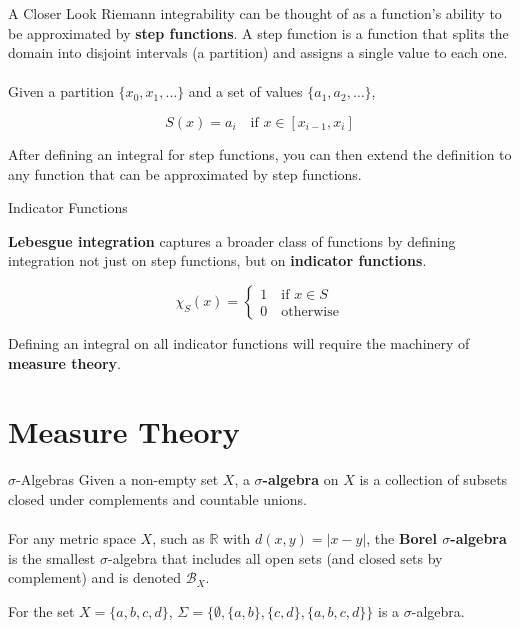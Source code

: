 \documentclass{beamer}
\begin{document}
\begin{frame}{A Closer Look}
    Riemann integrability can be thought of as a function's ability
    to be approximated by \textbf{step functions}. A step function
    is a function that splits the domain into disjoint intervals
    (a partition) and 
    assigns a single value to each one.\\~\\
    Given a partition $\{x_0, x_1, \ldots\}$ and a set of values $\{a_1, a_2, \ldots\}$,

    \[
        S(x) = a_i\quad\text{if $x \in [x_{i-1}, x_i]$}
    \]

    After defining an integral for step functions, you can
    then extend the definition to any function that can be approximated
    by step functions.

\end{frame}
\begin{frame}{Indicator Functions}

    \textbf{Lebesgue integration} captures a broader class of functions
    by defining integration not just on step functions, but on 
    \textbf{indicator functions}. 

    \[
        \chi_S(x) = \begin{cases}
            1\quad\text{if $x \in S$}\\
            0\quad\text{otherwise}
        \end{cases}  
    \]
    
    Defining an integral on all indicator functions will
    require the machinery of \textbf{measure theory}.
\end{frame}

\section{Measure Theory}

\begin{frame}{$\sigma$-Algebras}
    Given a non-empty set $X$, a \textbf{$\sigma$-algebra} on $X$ is a collection 
    of subsets closed under complements and countable unions. \\~\\
    For any metric space $X$, 
    such as $\mathbb{R}$ with $d(x,y) = |x-y|$, the 
    \textbf{Borel $\sigma$-algebra} is the smallest $\sigma$-algebra
    that includes all open sets (and closed sets by complement) and is denoted $\mathcal{B}_X$.
    \begin{example}
        For the set $X = \{a,b,c,d\}$, $\Sigma = \{\emptyset, \{a,b\}, \{c,d\}, \{a,b,c,d\}\}$
        is a $\sigma$-algebra. 
    \end{example}
\end{frame}
\end{document}
